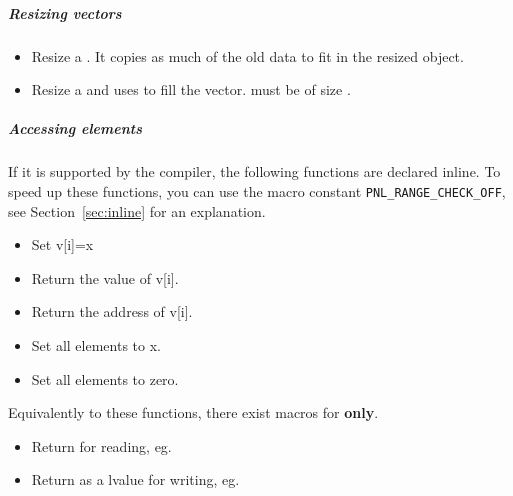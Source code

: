 \subparagraph{Resizing vectors}
\begin{itemize}
\item {}
  \sshortdescribe Resize a \PnlVect. It copies as much of the old
  data to fit in the resized object.
\item {} 
  \sshortdescribe Resize a \PnlVect and uses  to fill the
  vector.  must be of size .
\end{itemize}  

\subparagraph{Accessing elements}

If it is supported by the compiler, the following functions are declared
inline. To speed up these functions, you can use the macro constant
\texttt{PNL_RANGE_CHECK_OFF}, see Section~\ref{sec:inline} for an explanation. 

\begin{itemize}
\item {}
  \sshortdescribe Set v[i]=x  
\item {}
  \sshortdescribe Return the value of v[i].  
\item {}
  \sshortdescribe Return the address of v[i].  
\item {}
  \sshortdescribe Set all elements to x.  
\item {}
  \sshortdescribe Set all elements to zero.  
\end{itemize}
Equivalently to these functions, there exist macros for {\bf \PnlVect only}.
\begin{itemize}
\item {}
  \sshortdescribe Return  for reading, eg. 
  
\item {}
  \sshortdescribe Return  as a lvalue for writing, eg.
\end{itemize}


